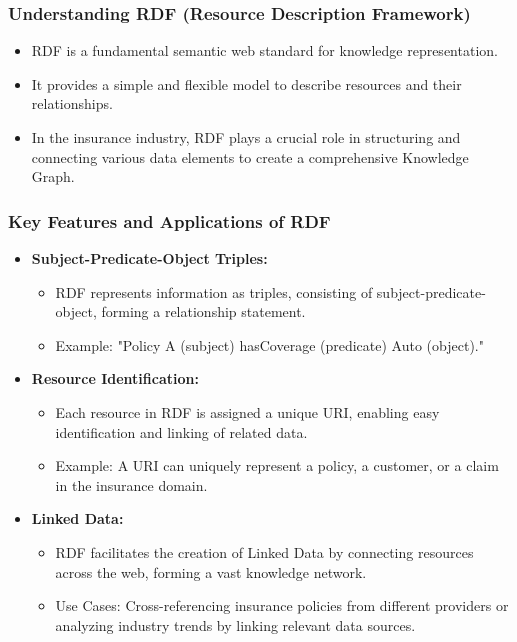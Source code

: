 \begin{frame}[fragile]
\frametitle{Understanding RDF (Resource Description Framework)}
\begin{itemize}
\item RDF is a fundamental semantic web standard for knowledge representation.
\item It provides a simple and flexible model to describe resources and their relationships.
\item In the insurance industry, RDF plays a crucial role in structuring and connecting various data elements to create a comprehensive Knowledge Graph.
\end{itemize}
\end{frame}

\begin{frame}[fragile]
\frametitle{Key Features and Applications of RDF}
\begin{itemize}
\item \textbf{Subject-Predicate-Object Triples:}
\begin{itemize}
\item RDF represents information as triples, consisting of subject-predicate-object, forming a relationship statement.
\item Example: "Policy A (subject) hasCoverage (predicate) Auto (object)."
\end{itemize}

\item \textbf{Resource Identification:}
\begin{itemize}
\item Each resource in RDF is assigned a unique URI, enabling easy identification and linking of related data.
\item Example: A URI can uniquely represent a policy, a customer, or a claim in the insurance domain.
\end{itemize}

\item \textbf{Linked Data:}
\begin{itemize}
\item RDF facilitates the creation of Linked Data by connecting resources across the web, forming a vast knowledge network.
\item Use Cases: Cross-referencing insurance policies from different providers or analyzing industry trends by linking relevant data sources.
\end{itemize}
\end{itemize}
\end{frame}

